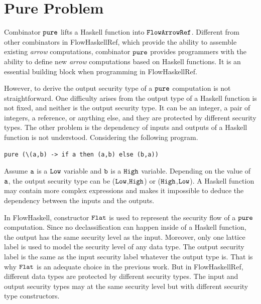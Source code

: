 \documentclass[a4paper]{report}
\newcommand{\co}[1]{$\cod{#1}$}
\begin{document}
\clearpage

\section{Pure Problem}
\label{chap4:pure}
Combinator \co{pure} lifts a Haskell function into \co{FlowArrowRef}. 
Different from other combinators in FlowHaskellRef, which provide the ability to
assemble existing {\em arrow} computations, combinator \co{pure} provides programmers with
the ability to define new {\em arrow} computations based on Haskell functions.
It is an essential building block when programming in FlowHaskellRef.

However, to derive the output security type of a \co{pure} computation is not straightforward.
One difficulty arises from the output type of a Haskell function is not fixed, and neither is the output
security type. It can be an integer, a pair of integers, a reference, or anything else,
and they are protected by different security types.
The other problem is the dependency of inputs and outputs of a Haskell function is not understood.
Considering the following program.
\begin{Verbatim}[fontsize=\footnotesize]
 pure (\(a,b) -> if a then (a,b) else (b,a))
\end{Verbatim}
Assume \co{a} is a \co{Low} variable and \co{b} is a \co{High} variable. Depending on the value of \co{a},
the output security type can be (\co{Low},\co{High}) or (\co{High},\co{Low}). A Haskell function may
contain more complex expressions and makes it impossible to deduce the dependency between
the inputs and the outputs.

In FlowHaskell, constructor \co{Flat} is used to represent the security flow of a \co{pure} computation. Since no 
declassification can happen inside of a Haskell function, the output has the same security level
as the input. Moreover, only one lattice label is used to model the security level of any
data type. The output security label is the same as the input security label whatever the output type is.
That is why \co{Flat} is an adequate choice in the previous work. 
But in FlowHaskellRef, different data types are protected by different security types. The input and output
security types may at the same security level but with different security type constructors. 
\end{document}
